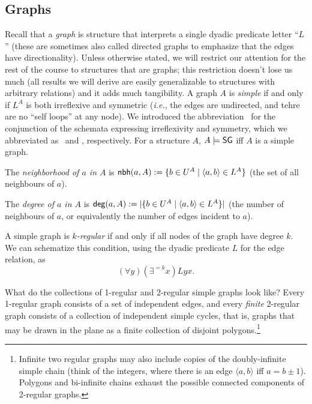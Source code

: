 \subsection*{Graphs}
Recall that a \emph{graph} is structure that interprets a single dyadic predicate letter ``$L$'' (these are sometimes also called directed graphs to emphasize that the edges have directionality). Unless otherwise stated, we will restrict our attention for the rest of the course to structures that are graphs; this restriction doesn't lose us much (all results we will derive are easily generalizable to structures with arbitrary relations) and it adds much tangibility. A graph $A$ is \emph{simple} if and only if $L^A$ is both irreflexive and symmetric (\emph{i.e.}, the edges are undirected, and tehre are no ``self loops'' at any node). We introduced the abbreviation \sg\ for the conjunction of the schemata expressing irreflexivity and symmetry, which we abbreviated as \irr\ and \sym, respectively. For a structure $A$, $A \models \mbox{$\mathsf{SG}$}$ iff $A$ is a simple graph. 
\iffalse
Note that for any two nodes $a, b$ in a simple graph, there can be \emph{at most one} edge $\langle a, b \rangle$ because the edge relation is a binary relation and hence a set (which disregards multiplicity). In the following definitions, suppose that $A$ is a simple graph with $a \in U^A$ (ie, $a$ is a node in the graph $A$). 
\fi
\begin{definition}
The \emph{neighborhood of $a$ in $A$} is $\mbox{$\mathsf{nbh}(a,A)$} := \{b\in U^A\mid \mbox{$\langle a,b \rangle$}\in L^A\}$ (the set of all neighbours of $a$).%
\end{definition}

\begin{definition}
The \emph{degree of $a$ in $A$} is $\mbox{$\mathsf{deg}(a,A)$} := \mbox{$|\{b\in U^A\mid \mbox{$\langle a,b \rangle$}\in L^A\}|$}$ (the number of neighbours of $a$, or equivalently the number of edges incident to $a$).
\end{definition}


\begin{definition}
A simple graph is \emph{$k$-regular} if and only if all nodes of the graph have degree $k$. We can schematize this condition, using the dyadic predicate $L$ for the edge relation, as
\[(\forall y)(\exists^{=k}x)Lyx.\]
\end{definition}

What do the collections of 1-regular and 2-regular simple graphs look like? Every 1-regular graph consists of a set of independent edges, and every \emph{finite} 2-regular graph consists of a collection of independent simple cycles, that is, graphs that may be drawn in the plane as a finite collection of disjoint polygons.\footnote{Infinite two regular graphs may also include copies of the doubly-infinite simple chain (think of the integers, where there is an edge $\langle a, b \rangle$ iff $a = b \pm 1$). Polygons and bi-infinite chains exhaust the possible connected components of 2-regular graphs.}

